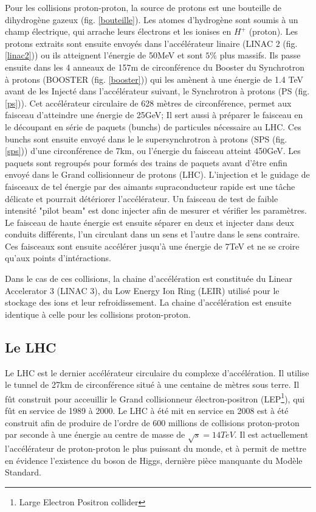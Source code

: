 Pour les collisions proton-proton, la source de protons est une bouteille de dihydrogène gazeux (fig. \ref{bouteille}). Les atomes d’hydrogène sont soumis à un champ électrique, qui arrache leurs électrons et les ionises en $H^{+}$ (proton). Les protons extraits sont ensuite envoyés dans l'accélérateur linaire (LINAC 2 (fig. \ref{linac2})) ou ils atteignent l'énergie de 50MeV et sont $5\%$ plus massifs. Ils passe ensuite dans les 4 anneaux de 157m de circonférence du Booster du Synchrotron à protons (BOOSTER (fig. \ref{booster})) qui les amènent à une énergie de 1.4 TeV avant de les Injecté dans l'accélérateur suivant, le Synchrotron à protons (PS (fig. \ref{ps})). Cet accélérateur circulaire de 628 mètres de circonférence, permet aux faisceau d'atteindre une énergie de 25GeV; Il sert aussi à préparer le faisceau en le découpant en série de paquets (bunchs) de particules nécessaire au LHC. Ces bunchs sont ensuite envoyé dans le le supersynchrotron à protons (SPS (fig. \ref{sps})) d'une circonférence de 7km, ou l'énergie du faisceau atteint 450GeV. Les paquets sont regroupés pour formés des trains de paquets avant d'être enfin envoyé dans le Grand collisionneur de protons (LHC). L'injection et le guidage de faisceaux de tel énergie par des aimants supraconducteur rapide est une tâche délicate et pourrait détériorer l'accélérateur. Un faisceau de test de faible intensité "pilot beam" est donc injecter afin de mesurer et vérifier les paramètres. Le faisceau de haute énergie est ensuite séparer en deux et injecter dans deux conduits différents, l'un circulant dans un sens et l'autre dans le sens contraire. Ces faisceaux sont ensuite accélérer jusqu'à une énergie de 7TeV et ne se croire qu'aux points d'intéractions.

Dans le cas de ces collisions, la chaine d'accélération est constituée du Linear Accelerator 3 (LINAC 3), du Low Energy Ion Ring (LEIR) utilisé pour le stockage des ions et leur refroidissement. La chaine d'accélération est ensuite identique à celle pour les collisions proton-proton.

\subsection{Le LHC}
Le LHC est le dernier accélérateur circulaire du complexe d'accélération. Il utilise le tunnel de 27km de circonférence situé à une centaine de mètres sous terre. Il fût construit pour acceuillir le Grand collisionneur électron-positron (LEP\footnote{Large Electron Positron collider}), qui fût en service de 1989 à 2000. Le LHC à été mit en service en 2008 est à été construit afin de produire de l'ordre de 600 millions de collisions proton-proton par seconde à une énergie au centre de masse de $\sqrt{s}=14 TeV$. Il est actuellement l'accélérateur de proton-proton le plus puissant du monde, et à permit de mettre en évidence l'existence du boson de Higgs, dernière pièce manquante du Modèle Standard.

